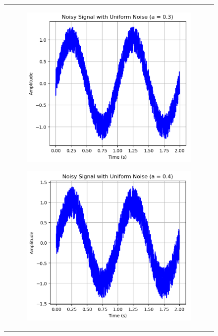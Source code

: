 \documentclass[hidelinks,12pt]{article}
\begin{document}
	\begin{figure}[!h]
		\centering
		\begin{tabular}{c}
			\begin{subfigure}[h]{0.3\textwidth}
				\centering
				\includegraphics[width=\textwidth]{figures/uniform_noise/0.3.png}
			\end{subfigure}
			\hfill
			\begin{subfigure}[h]{0.3\textwidth}
				\centering
				\includegraphics[width=\textwidth]{figures/uniform_noise/0.4.png}

\end{subfigure}
\end{tabular}
\end{figure}
\end{document}
